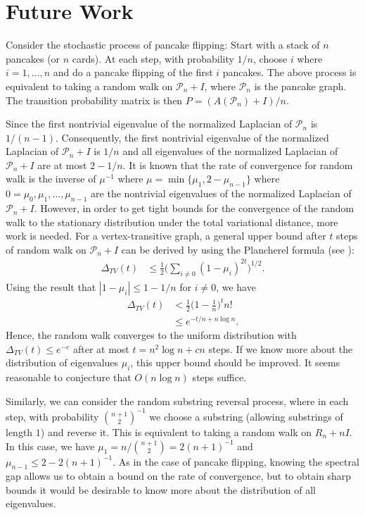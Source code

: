 
\section{Future Work}
Consider the stochastic process of pancake flipping:  Start with a stack of $n$ pancakes (or $n$ cards). At each
step, with probability $1/n$,  choose $i$ where $i=1, \ldots, n$ and  do a pancake flipping of the first $i$ pancakes. 
The above process is equivalent to taking a random walk on 
$\mathcal{P}_n + I$, where $\mathcal{P}_n$ is the pancake graph. The transition probability 
matrix is then $P=(A(\mathcal{P}_n)+I)/n$.

Since the first nontrivial eigenvalue of the normalized Laplacian of $\mathcal{P}_n$ is $1/(n-1)$. Consequently,
the first nontrivial eigenvalue of
the normalized Laplacian of $\mathcal{P}_n + I$ is $1/n$ and all eigenvalues of the normalized Laplacian
of $\mathcal{P}_n + I$ are at most $2-1/n$. It is known that the rate of convergence for random walk is the inverse of  $\mu^{-1}$ where $\mu= \min \{\mu_1, 2-\mu_{n-1}\}$ where $0=\mu_0,
\mu_1, \ldots, \mu_{n-1}$ are the nontrivial eigenvalues of the normalized Laplacian of $\mathcal{P}_n + I$. However, in order to get tight bounds for the convergence of the random walk to the stationary distribution under the  total variational distance, more work is needed. For a vertex-transitive graph, a general upper bound after $t$ steps of random walk on 
$\mathcal{P}_n + I$ can be derived by using the Plancherel formula (see \cite{Chung1997}):
\begin{align*}
\Delta_{TV}(t) &\leq \frac 1 2 \Big( \sum_{i \not = 0} (1-\mu_i)^{2t}\Big)^{1/2}.
\end{align*}
Using the result that $|1-\mu_i| \leq 1-1/n$ for $i \not = 0$, we have
\begin{align*}
\Delta_{TV}(t) &< \frac 1 2 \Big(1-\frac 1 n\Big)^t n!\\
&\leq e^{-t/n+n \log n}.
\end{align*}
Hence, the random walk converges to the uniform distribution with $\Delta_{TV}(t) \leq e^{-c}$ after at most $t=n^2 \log n + c n$ steps.
If we know more about the distribution of eigenvalues $\mu_i$, this upper bound should be improved.
It seems reasonable to conjecture that $O(n \log n)$ steps suffice.


Similarly, we can consider the random substring reversal process, where in each
step, with probability $\binom{n+1}{2}^{-1}$ we choose a substring (allowing substrings of length $1$) and reverse it.
This is equivalent to taking a random walk on $R_n+ nI$. 
In this case, we have $\mu_1 = n/ \binom {n+1} 2= 2 (n+1)^{-1}$ and $\mu_{n-1} \leq 2  - 2 (n+1)^{-1}$.   As in the case of 
pancake flipping, knowing the spectral gap allows us to obtain a bound on
the rate of convergence, but to obtain sharp bounds it would be desirable to
know more about the distribution of all eigenvalues.

